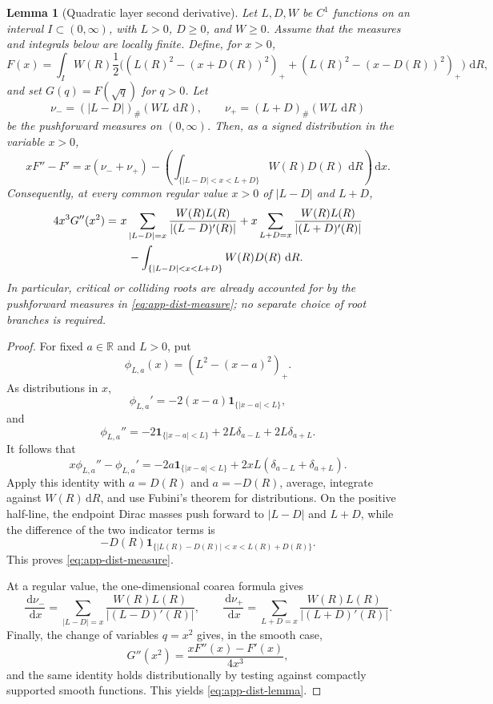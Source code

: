 \documentclass[pdflatex,sn-mathphys-num]{sn-jnl}
\numberwithin{equation}{section}
\theoremstyle{thmstyleone}
\newtheorem{lemma}[theorem]{Lemma}
\theoremstyle{thmstylethree}
\newcommand{\R}{\mathbb{R}}
\newcommand{\1}{\mathbf{1}}
\newcommand{\dd}{\,\mathrm{d}}
\begin{document}
\begin{lemma}[Quadratic layer second derivative]\label{lem:app-second-dist}
Let $L,D,W$ be $C^1$ functions on an interval
$I\subset(0,\infty)$, with $L>0$, $D\ge0$, and $W\ge0$. Assume that
the measures and integrals below are locally finite. Define, for $x>0$,
\[
 F(x)=\int_I W(R)\frac12\Big(
 (L(R)^2-(x+D(R))^2)_+
 +(L(R)^2-(x-D(R))^2)_+
 \Big)\,\dd R,
\]
and set $G(q)=F(\sqrt q)$ for $q>0$. Let
\[
 \nu_-=(|L-D|)_\#(W L\,\dd R),
 \qquad
 \nu_+=(L+D)_\#(W L\,\dd R)
\]
be the pushforward measures on $(0,\infty)$. Then, as a signed
distribution in the variable $x>0$,
\begin{equation}\label{eq:app-dist-measure}
 xF''-F'
 =
 x(\nu_-+\nu_+)
 -
 \left(
 \int_{\{|L-D|<x<L+D\}}W(R)D(R)\,\dd R
 \right)\dd x.
\end{equation}
Consequently, at every common regular value $x>0$ of $|L-D|$ and
$L+D$,
\begin{align}\label{eq:app-dist-lemma}
4x^3G''(x^2)=&\
 x\sum_{|L-D|=x}\frac{W(R)L(R)}{|(L-D)'(R)|}
 +x\sum_{L+D=x}\frac{W(R)L(R)}{|(L+D)'(R)|}\notag\\
&\quad
 -\int_{\{|L-D|<x<L+D\}}W(R)D(R)\,\dd R.
\end{align}
In particular, critical or colliding roots are already accounted for
by the pushforward measures in \eqref{eq:app-dist-measure}; no
separate choice of root branches is required.
\end{lemma}

\begin{proof}
For fixed $a\in\R$ and $L>0$, put
\[
 \phi_{L,a}(x)=(L^2-(x-a)^2)_+.
\]
As distributions in $x$,
\[
 \phi_{L,a}'=-2(x-a)\1_{\{|x-a|<L\}},
\]
and
\[
 \phi_{L,a}''
 =
 -2\1_{\{|x-a|<L\}}
 +2L\delta_{a-L}
 +2L\delta_{a+L}.
\]
It follows that
\[
 x\phi_{L,a}''-\phi_{L,a}'
 =
 -2a\1_{\{|x-a|<L\}}
 +2xL(\delta_{a-L}+\delta_{a+L}).
\]
Apply this identity with $a=D(R)$ and $a=-D(R)$, average, integrate
against $W(R)\dd R$, and use Fubini's theorem for distributions. On
the positive half-line, the endpoint Dirac masses push forward to
$|L-D|$ and $L+D$, while the difference of the two indicator terms is
\[
 -D(R)\1_{\{|L(R)-D(R)|<x<L(R)+D(R)\}}.
\]
This proves \eqref{eq:app-dist-measure}.

At a regular value, the one-dimensional coarea formula gives
\[
 \frac{\dd\nu_-}{\dd x}
 =
 \sum_{|L-D|=x}\frac{W(R)L(R)}{|(L-D)'(R)|},
 \qquad
 \frac{\dd\nu_+}{\dd x}
 =
 \sum_{L+D=x}\frac{W(R)L(R)}{|(L+D)'(R)|}.
\]
Finally, the change of variables $q=x^2$ gives, in the smooth case,
\[
 G''(x^2)=\frac{xF''(x)-F'(x)}{4x^3},
\]
and the same identity holds distributionally by testing against
compactly supported smooth functions. This yields
\eqref{eq:app-dist-lemma}.
\end{proof}
\end{document}
